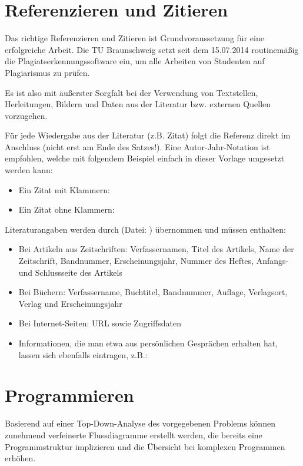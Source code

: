 \section{Referenzieren und Zitieren}

Das richtige Referenzieren und Zitieren ist Grundvoraussetzung für eine erfolgreiche Arbeit. Die TU Braunschweig setzt seit dem 15.07.2014 routinemäßig
die Plagiatserkennungssoftware  ein, um alle Arbeiten von Studenten auf Plagiarismus zu prüfen.

Es ist also mit äußerster Sorgfalt bei der Verwendung von Textstellen, Herleitungen, Bildern und Daten aus der Literatur
bzw. externen Quellen vorzugehen.

Für jede Wiedergabe aus der Literatur (z.B. Zitat) folgt die Referenz direkt im Anschluss (nicht erst am Ende des Satzes!). Eine Autor-Jahr-Notation ist 
empfohlen, welche mit folgendem Beispiel einfach in dieser Vorlage umgesetzt werden kann:
\begin{itemize}
 \item Ein Zitat mit Klammern: \citep{autor2012}
 \item Ein Zitat ohne Klammern: \cite{autor2012}
\end{itemize}

Literaturangaben werden durch  (Datei: ) übernommen und müssen enthalten:
\begin{itemize}
 \item Bei Artikeln aus Zeitschriften: Verfassernamen, Titel des Artikels, Name der Zeitschrift, Bandnummer, 
       Erscheinungsjahr, Nummer des Heftes, Anfangs- und Schlussseite des Artikels
 \item Bei Büchern: Verfassername, Buchtitel, Bandnummer, Auflage, Verlagsort, Verlag und Erscheinungsjahr     
 \item Bei Internet-Seiten: URL sowie Zugriffsdaten
 \item Informationen, die man etwa aus persönlichen Gesprächen erhalten hat, lassen sich ebenfalls eintragen, z.B.:
\end{itemize}

\section{Programmieren}

Basierend auf einer Top-Down-Analyse des vorgegebenen Problems können zunehmend verfeinerte 
Flussdiagramme erstellt werden, die bereits eine Programmstruktur implizieren und die Übersicht bei komplexen
Programmen erhöhen.

